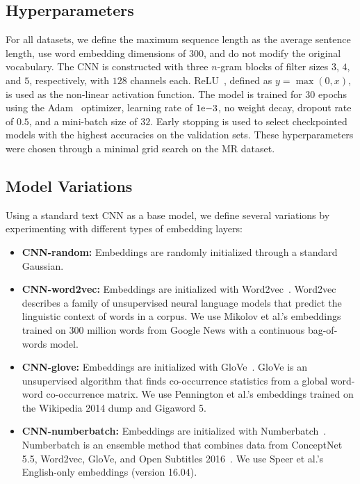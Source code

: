\documentclass{article}
\begin{document}
\subsection{Hyperparameters}
For all datasets, we define the maximum sequence length as the average sentence length, use word embedding dimensions of $300$, and do not modify the original vocabulary. The CNN is constructed with three $n$-gram blocks of filter sizes $3$, $4$, and $5$, respectively, with $128$ channels each. ReLU~\cite{relu}, defined as $y=\max(0,x)$, is used as the non-linear activation function. The model is trained for $30$ epochs using the Adam~\cite{adam} optimizer, learning rate of $1{\rm e}{-3}$, no weight decay, dropout rate of $0.5$, and a mini-batch size of $32$. Early stopping is used to select checkpointed models with the highest accuracies on the validation sets. These hyperparameters were chosen through a minimal grid search on the MR dataset.

\subsection{Model Variations}
Using a standard text CNN as a base model, we define several variations by experimenting with different types of embedding layers:
\begin{itemize}
    \item \textbf{CNN-random:} Embeddings are randomly initialized through a standard Gaussian.
    \item \textbf{CNN-word2vec:} Embeddings are initialized with Word2vec~\cite{w2v}. Word2vec describes a family of unsupervised neural language models that predict the linguistic context of words in a corpus. We use Mikolov et al.'s embeddings trained on 300 million words from Google News with a continuous bag-of-words model.
    \item \textbf{CNN-glove:} Embeddings are initialized with GloVe~\cite{glove}. GloVe is an unsupervised algorithm that finds co-occurrence statistics from a global word-word co-occurrence matrix. We use Pennington et al.'s embeddings trained on the Wikipedia 2014 dump and Gigaword 5.
    \item \textbf{CNN-numberbatch:} Embeddings are initialized with Numberbatch~\cite{nb}. Numberbatch is an ensemble method that combines data from ConceptNet 5.5, Word2vec, GloVe, and Open Subtitles 2016~\cite{opensub}. We use Speer et al.'s English-only embeddings (version 16.04).
\end{itemize}
\end{document}
